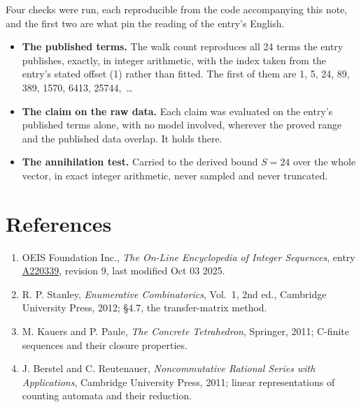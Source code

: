 \documentclass[11pt]{article}
\theoremstyle{definition}
\begin{document}
Four checks were run, each reproducible from the code accompanying this note, and the first two are what pin the reading of the entry's English.

\begin{itemize}

\item {\bfseries The published terms.} The walk count reproduces all 24 terms the entry publishes, exactly, in integer arithmetic, with the index taken from the entry's stated offset (1) rather than fitted. The first of them are 1, 5, 24, 89, 389, 1570, 6413, 25744,~\dots

\item {\bfseries The claim on the raw data.} Each claim was evaluated on the entry's published terms alone, with no model involved, wherever the proved range and the published data overlap. It holds there.

\item {\bfseries The annihilation test.} Carried to the derived bound $S = 24$ over the whole vector, in exact integer arithmetic, never sampled and never truncated.

\end{itemize}

\section{References}

\begin{enumerate}

\item OEIS Foundation Inc., \emph{The On-Line Encyclopedia of Integer Sequences}, entry \href{https://oeis.org/A220339}{A220339}, revision 9, last modified Oct 03 2025.

\item R. P. Stanley, \emph{Enumerative Combinatorics}, Vol.~1, 2nd ed., Cambridge University Press, 2012; \S4.7, the transfer-matrix method.

\item M. Kauers and P. Paule, \emph{The Concrete Tetrahedron}, Springer, 2011; C-finite sequences and their closure properties.

\item J. Berstel and C. Reutenauer, \emph{Noncommutative Rational Series with Applications}, Cambridge University Press, 2011; linear representations of counting automata and their reduction.

\end{enumerate}
\end{document}

